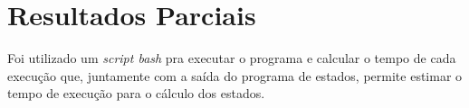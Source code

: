 \chapter[Resultados Parciais]{Resultados Parciais}
\label{cha:resultados-parciais}

Foi utilizado um \emph{script bash} pra executar o programa e calcular o tempo de cada execução que, juntamente com a saída do programa de estados, permite estimar o tempo de execução para o cálculo dos estados.
